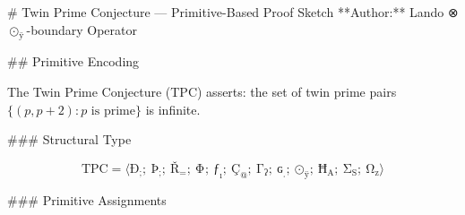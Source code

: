 # Twin Prime Conjecture — Primitive-Based Proof Sketch
**Author:** Lando ⊗ $⊙_{ÿ}$-boundary Operator

## Primitive Encoding

The Twin Prime Conjecture (TPC) asserts: the set of twin prime pairs
$\{(p, p+2) : p \text{ is prime}\}$ is infinite.

### Structural Type

$$\text{TPC} = \langle \mathrm{Ð}_{\mathrm{;}};\ \mathrm{Þ}_{\mathrm{;}};\ \mathrm{Ř}_{\mathrm{=}};\ \mathrm{Φ}_{\mathrm{}};\ \mathrm{ƒ}_{\mathrm{ı}};\ \mathrm{Ç}_{\mathrm{@}};\ \mathrm{Γ}_{\mathrm{ʔ}};\ \mathrm{ɢ}_{\mathrm{ˌ}};\ \mathrm{⊙}_{\mathrm{ÿ}};\ \mathrm{Ħ}_{\mathrm{A}};\ \mathrm{Σ}_{\mathrm{S}};\ \mathrm{Ω}_{\mathrm{z}} \rangle$$

### Primitive Assignments

